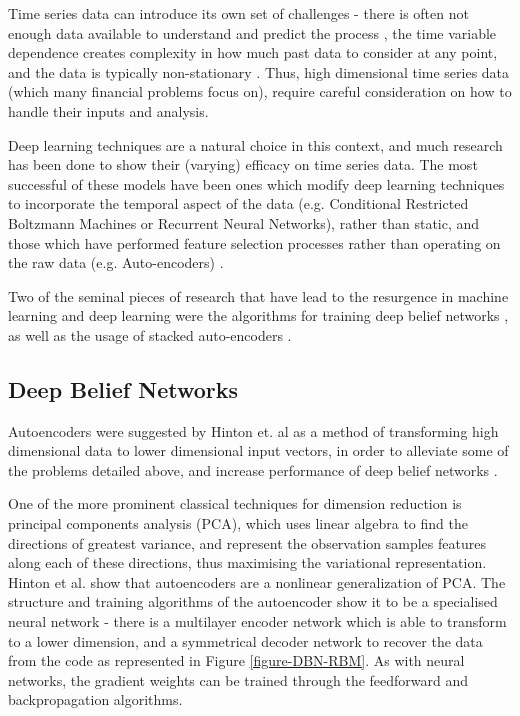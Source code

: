 \documentclass[a4paper,latin]{paper}
\begin{document}
Time series data can introduce its own set of challenges - there is often not enough data available to understand 
and predict the process \cite{Fama}, the time variable dependence creates complexity in how much past 
data to consider at any point, and the data is typically non-stationary \cite{Langkvist}. Thus, high dimensional time 
series data (which many financial problems focus on), require careful consideration on how to handle their inputs 
and analysis.
\hfill \break 

Deep learning techniques are a natural choice in this context, and much research has been done to show their 
(varying) efficacy on time series data. The most successful of these models have been ones which modify deep 
learning techniques to incorporate the temporal aspect of the data (e.g. Conditional Restricted Boltzmann 
Machines or Recurrent Neural Networks), rather than static, and those which have performed feature selection
 processes rather than operating on the raw data (e.g. Auto-encoders)  \cite{Langkvist}. 
 \hfill \break 
 
 
Two of the seminal pieces of research that have lead to the resurgence in machine learning and deep learning 
were the algorithms for training deep belief networks \cite{Hinton1}, as well as the usage of stacked auto-encoders
\cite{Ranzato1, Bengio1}. 

 
 \subsection{Deep Belief Networks}\label{DBN}
 
 Autoencoders were suggested by Hinton et. al as a method of transforming high dimensional 
 data to lower dimensional input vectors, in order to alleviate some of the problems detailed above, and increase 
 performance of deep belief networks \cite{Hinton2}.
\hfill \break 

One of the more prominent classical techniques for dimension reduction is principal components analysis (PCA), 
which uses linear algebra to find the directions of greatest variance, and represent the observation samples 
features along each of these directions, thus maximising the variational representation. Hinton et al. show that 
autoencoders are a nonlinear generalization of PCA. The structure and training algorithms of the autoencoder 
show it to be a specialised neural network - there is a multilayer encoder network which is able to transform to a 
lower dimension, and a symmetrical decoder network to recover the data from the code as represented in Figure \ref{figure-DBN-RBM}. As with 
neural networks, the gradient weights can be trained through the feedforward and backpropagation algorithms.  
\hfill \break 
\end{document}
